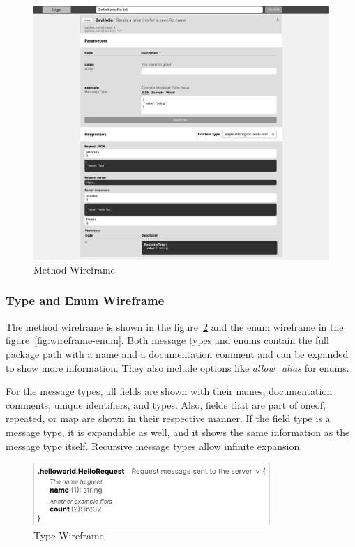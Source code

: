 \begin{figure}[hbt!]
    \centering
    \captionsetup{justification=centering}
    \includegraphics[width=1.0\textwidth]{images/design/wireframes/method}
    \caption{Method Wireframe}
    \label{fig:wireframe-method}
\end{figure}

\subsubsection{Type and Enum Wireframe}
The method wireframe is shown in the figure~\ref{fig:wireframe-type} and the enum wireframe in the figure~\ref{fig:wireframe-enum}.
Both message types and enums contain the full package path with a name and a documentation comment and can be expanded to show more information.
They also include options like \textit{allow\_alias} for enums.

For the message types, all fields are shown with their names, documentation comments, unique identifiers, and types.
Also, fields that are part of oneof, repeated, or map are shown in their respective manner.
If the field type is a message type, it is expandable as well, and it shows the same information as the message type itself.
Recursive message types allow infinite expansion.

\begin{figure}[hbt!]
    \centering
    \captionsetup{justification=centering}
    \includegraphics[width=0.8\textwidth]{images/design/wireframes/type}
    \caption{Type Wireframe}
    \label{fig:wireframe-type}
\end{figure}


